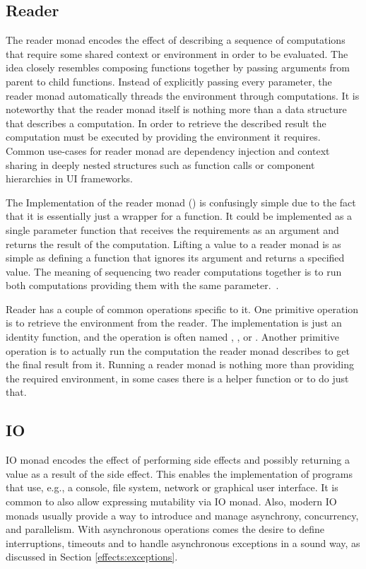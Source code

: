 \subsection{Reader}
The reader monad encodes the effect of describing a sequence of computations that require some shared context or environment in order to be evaluated. The idea closely resembles composing functions together by passing arguments from parent to child functions. Instead of explicitly passing every parameter, the reader monad automatically threads the environment through computations. It is noteworthy that the reader monad itself is nothing more than a data structure that describes a computation. In order to retrieve the described result the computation must be executed by providing the environment it requires. Common use-cases for reader monad are dependency injection and context sharing in deeply nested structures such as function calls or component hierarchies in UI frameworks.



The Implementation of the reader monad () is confusingly simple due to the fact that it is essentially just a wrapper for a function. It could be implemented as a single parameter function that receives the requirements as an argument and returns the result of the computation. Lifting a value to a reader monad is as simple as defining a function that ignores its argument and returns a specified value. The meaning of sequencing two reader computations together is to run both computations providing them with the same parameter.~\cite{fp-overloading-ho-polymorphism}.

Reader has a couple of common operations specific to it. One primitive operation is to retrieve the environment from the reader. The implementation is just an identity function, and the operation is often named , , or . Another primitive operation is to actually run the computation the reader monad describes to get the final result from it. Running a reader monad is nothing more than providing the required environment, in some cases there is a helper function  or  to do just that.


\subsection{IO}
IO monad encodes the effect of performing side effects and possibly returning a value as a result of the side effect. This enables the implementation of programs that use, e.g., a console, file system, network or graphical user interface. It is common to also allow expressing mutability via IO monad. Also, modern IO monads usually provide a way to introduce and manage asynchrony, concurrency, and parallelism. With asynchronous operations comes the desire to define interruptions, timeouts and to handle asynchronous exceptions in a sound way, as discussed in Section \ref{effects:exceptions}.

